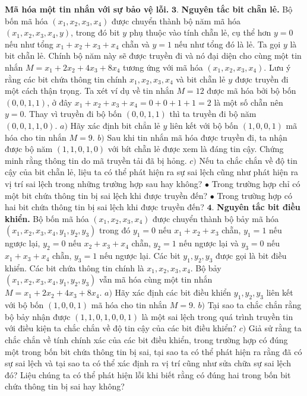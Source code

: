 \begin{multicols}{2}
	\vskip 0.1cm
	 \textbf{\color{cackithi}Mã hóa một tin nhắn với sự bảo vệ lỗi.}
	\vskip 0.1cm 
	$\pmb{3.}$  \textbf{\color{cackithi}Nguyên tắc bit chẵn lẻ.}
	\vskip 0.1cm 
	Bộ bốn mã hóa $(x_1,x_2,x_3,x_4)$ được chuyển thành bộ năm mã hóa $(x_1,x_2,x_3,x_4,y)$, trong đó bit $y$ phụ thuộc vào tính chẵn lẻ, cụ thể hơn $y=0$ nếu như tổng $x_1+x_2+x_3+x_4$ chẵn và $y=1$ nếu như tổng đó là lẻ. Ta gọi $y$ là bit chẵn lẻ. Chính bộ năm này sẽ được truyền đi và nó đại diện cho cùng một tin nhắn  $M=x_1+2x_2+4x_3+8x_4$ tương ứng với mã hóa $(x_1,x_2,x_3,x_4)$. Lưu ý rằng các bit chứa thông tin chính $x_1,x_2,x_3,x_4$ và bit chẵn lẻ $y$ được truyền đi một cách thận trọng.
	\vskip 0.1cm 
	Ta xét ví dụ về tin nhắn $M=12$ được mã hóa bởi bộ bốn $(0,0,1,1)$, ở đây $x_1+x_2+x_3+x_4=0+0+1+1=2$ là một số chẵn nên $y=0$. Thay vì truyền đi bộ bốn $(0,0,1,1)$ thì ta truyền đi bộ năm $(0,0,1,1,0)$. 
	\vskip 0.1cm
	$a)$ Hãy xác định bit chẳn lẻ $y$ liên kết với bộ bốn $(1,0,0,1)$ mã hóa cho tin nhắn $M=9$.
	\vskip 0.1cm 
	$b)$ Sau khi tin nhắn mã hóa được truyền đi, ta nhận được bộ năm $(1,1,0,1,0)$ với bít chẵn lẻ được xem là đáng tin cậy. Chứng minh rằng thông tin do mã truyền tải đã bị hỏng.
	\vskip 0.1cm 
	$c)$ Nếu ta chắc chắn về độ tin cậy của bit chẵn lẻ, liệu ta có thể phát hiện ra sự sai lệch cũng như phát hiện ra vị trí sai lệch trong những trường hợp sau hay không?
	\vskip 0.1cm 
	$\bullet$ Trong trường hợp chỉ có một bit chứa thông tin bị sai lệch khi được truyền đến?
	\vskip 0.1cm 
	$\bullet$ Trong trường hợp có hai bit chứa thông tin bị sai lệch khi được truyền đến?
	\vskip 0.1cm
	$\pmb{4.}$  \textbf{\color{cackithi}Nguyên tắc bit điều khiển.}
	\vskip 0.1cm 
	Bộ bốn mã hóa $(x_1,x_2,x_3,x_4)$ được chuyển thành bộ bảy mã hóa $(x_1,x_2,x_3,x_4,y_1,y_2,y_3)$ trong đó $y_1=0$ nếu $x_1+x_2+x_3$ chẵn, $y_1=1$ nếu ngược lại, $y_2=0$ nếu $x_2+x_3+x_4$ chẵn, $y_2=1$ nếu ngược lại và  $y_3=0$ nếu $x_1+x_3+x_4$ chẵn, $y_3=1$ nếu ngược lại. Các bit $y_1,y_2,y_3$ được gọi là bit điều khiển. Các bit chứa thông tin chính là $x_1,x_2,x_3,x_4$. Bộ bảy $(x_1,x_2,x_3,x_4,y_1,y_2,y_3)$ vẫn mã hóa cùng một tin nhắn $M=x_1+2x_2+4x_3+8x_4$. 
	\vskip 0.1cm
	$a)$ Hãy xác định các bit điều khiển $y_1,y_2,y_3$ liên kết với bộ bốn $(1,0,0,1)$ mã hóa cho tin nhắn $M=9$.
	\vskip 0.1cm
	$b)$ Tại sao ta chắc chắn rằng bộ bảy nhận được $(1,1,0,1,0,0,1)$ là một sai lệch trong quá trình truyền tin với điều kiện ta chắc chắn về độ tin cậy của các bit điều khiển?
	\vskip 0.1cm 
	$c)$ Giả sử rằng ta chắc chắn về tính chính xác của các bit điều khiển, trong trường hợp có đúng một trong bốn bit chứa thông tin bị sai, tại sao ta có thể phát hiện ra rằng đã có sự sai lệch và tại sao ta có thể xác định ra vị trí cũng như sửa chữa sự sai lệch đó? Liệu chúng ta có thể phát hiện lỗi khi biết rằng có đúng hai trong bốn bit chứa thông tin bị sai hay không? 

\end{multicols}
